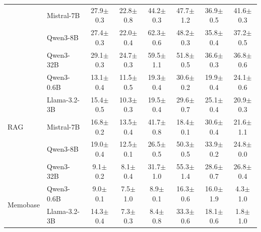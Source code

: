 \begin{table}[t]
\begin{tabular}{@{}ll cccccc@{}}
  & Mistral-7B     & 27.9{\scriptsize$\pm$0.3} & 22.8{\scriptsize$\pm$0.8} & 44.2{\scriptsize$\pm$0.3} & 47.7{\scriptsize$\pm$1.2} & 36.9{\scriptsize$\pm$0.5} & 41.6{\scriptsize$\pm$0.3} \\

  & Qwen3-8B       & 27.4{\scriptsize$\pm$0.3} & 22.0{\scriptsize$\pm$0.4} & 62.3{\scriptsize$\pm$0.6} & 48.2{\scriptsize$\pm$0.3} & 35.8{\scriptsize$\pm$0.4} & 37.2{\scriptsize$\pm$0.5} \\

  & Qwen3-32B      & 29.1{\scriptsize$\pm$0.3} & 24.7{\scriptsize$\pm$0.3} & 59.5{\scriptsize$\pm$1.1} & 51.8{\scriptsize$\pm$0.5} & 36.6{\scriptsize$\pm$0.3} & 36.8{\scriptsize$\pm$0.6} \\
\midrule
\multirow{5}{*}{RAG}
  & Qwen3-0.6B     & 13.1{\scriptsize$\pm$0.4} & 11.5{\scriptsize$\pm$0.5} & 19.3{\scriptsize$\pm$0.4} & 30.6{\scriptsize$\pm$0.2} & 19.9{\scriptsize$\pm$0.4} & 24.1{\scriptsize$\pm$0.6} \\

  & Llama-3.2-3B   & 15.4{\scriptsize$\pm$0.5} & 10.3{\scriptsize$\pm$0.3} & 19.5{\scriptsize$\pm$0.4} & 29.6{\scriptsize$\pm$0.7} & 25.1{\scriptsize$\pm$0.4} & 20.9{\scriptsize$\pm$0.3} \\

  & Mistral-7B     & 16.8{\scriptsize$\pm$0.2} & 13.5{\scriptsize$\pm$0.4} & 41.7{\scriptsize$\pm$0.8} & 18.4{\scriptsize$\pm$0.1} & 30.6{\scriptsize$\pm$0.4} & 21.6{\scriptsize$\pm$1.1} \\

  & Qwen3-8B       & 19.0{\scriptsize$\pm$0.4} & 12.5{\scriptsize$\pm$0.1} & 26.5{\scriptsize$\pm$0.5} & 50.3{\scriptsize$\pm$0.5} & 33.9{\scriptsize$\pm$0.2} & 24.8{\scriptsize$\pm$0.0} \\

  & Qwen3-32B      & 9.1{\scriptsize$\pm$0.2} & 8.1{\scriptsize$\pm$0.4} & 31.7{\scriptsize$\pm$1.0} & 55.3{\scriptsize$\pm$1.4} & 28.6{\scriptsize$\pm$0.7} & 26.8{\scriptsize$\pm$0.4} \\
\midrule
\multirow{5}{*}{Memobase}
  & Qwen3-0.6B     & 9.0{\scriptsize$\pm$0.1} & 7.5{\scriptsize$\pm$1.0} & 8.9{\scriptsize$\pm$0.1} & 16.3{\scriptsize$\pm$0.6} & 16.0{\scriptsize$\pm$1.9} & 4.3{\scriptsize$\pm$1.0} \\

  & Llama-3.2-3B   & 14.3{\scriptsize$\pm$0.4} & 7.3{\scriptsize$\pm$0.3} & 8.4{\scriptsize$\pm$0.8} & 33.3{\scriptsize$\pm$0.6} & 18.1{\scriptsize$\pm$0.6} & 1.8{\scriptsize$\pm$1.0} \\


\end{tabular}
\end{table}

